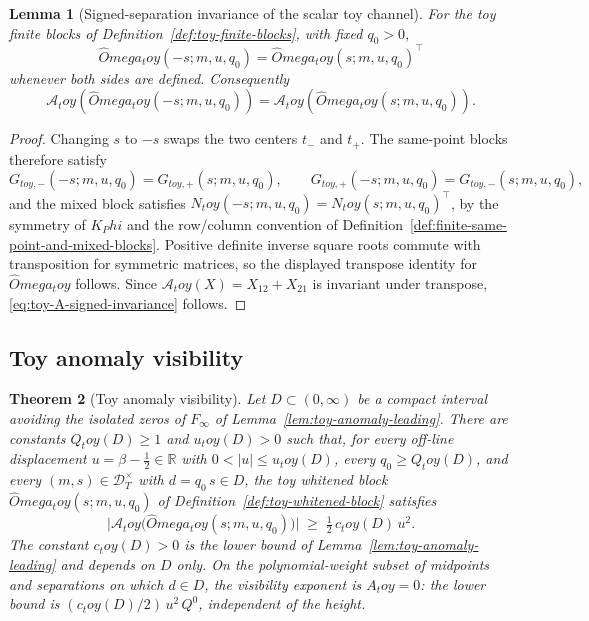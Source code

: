 \documentclass[11pt,a4paper]{amsart}
\def\Omega{Omega}%
\def\Phi{Phi}%
\def\toy{toy}%
\numberwithin{equation}{section}
\theoremstyle{plain}
\newtheorem{theorem}{Theorem}[section]
\newtheorem{lemma}[theorem]{Lemma}
\theoremstyle{definition}
\newcommand{\Om}{\Omega}
\newcommand{\toy}{\mathrm{toy}}
\begin{document}
\begin{lemma}[Signed-separation invariance of the scalar toy channel]
\label{lem:toy-signed-separation-invariance}
For the toy finite blocks of Definition~\ref{def:toy-finite-blocks}, with fixed
\(q_0>0\),
\[
        \widehat\Om_\toy(-s;m,u,q_0)=\widehat\Om_\toy(s;m,u,q_0)^\top
\]
whenever both sides are defined.  Consequently
\begin{equation}
\label{eq:toy-A-signed-invariance}
        \mathcal A_\toy(\widehat\Om_\toy(-s;m,u,q_0))
        =\mathcal A_\toy(\widehat\Om_\toy(s;m,u,q_0)).
\end{equation}
\end{lemma}

\begin{proof}
Changing \(s\) to \(-s\) swaps the two centers \(t_-\) and \(t_+\).
The same-point blocks therefore satisfy
\[
        G_{\toy,-}(-s;m,u,q_0)=G_{\toy,+}(s;m,u,q_0),\qquad
        G_{\toy,+}(-s;m,u,q_0)=G_{\toy,-}(s;m,u,q_0),
\]
and the mixed block satisfies
\(N_\toy(-s;m,u,q_0)=N_\toy(s;m,u,q_0)^\top\), by the symmetry of
\(K_\Phi\) and the row/column convention of
Definition~\ref{def:finite-same-point-and-mixed-blocks}.  Positive
definite inverse square roots commute with transposition for symmetric
matrices, so the displayed transpose identity for \(\widehat\Om_\toy\)
follows.  Since
\(\mathcal A_\toy(X)=X_{12}+X_{21}\) is invariant under transpose,
\eqref{eq:toy-A-signed-invariance} follows.
\end{proof}

\subsection{Toy anomaly visibility}
\label{subsec:toy-anomaly-visibility}

\begin{theorem}[Toy anomaly visibility]
\label{thm:toy-anomaly-visibility}
Let \(D\subset(0,\infty)\) be a compact interval avoiding the
isolated zeros of \(F_{\infty}\) of
Lemma~\ref{lem:toy-anomaly-leading}.  There are constants
\(Q_\toy(D)\ge1\) and \(u_\toy(D)>0\) such that, for every off-line
displacement \(u=\beta-\tfrac12\in\mathbb R\) with \(0<|u|\le u_\toy(D)\),
every \(q_0\ge Q_\toy(D)\), and every \((m,s)\in\mathcal D_T^\times\)
with \(d=q_0\,s\in D\), the toy
whitened block \(\widehat\Om_\toy(s;m,u,q_0)\) of
Definition~\ref{def:toy-whitened-block} satisfies
\begin{equation}
\label{eq:toy-anomaly-visibility-A}
        \bigl|\mathcal A_\toy\bigl(\widehat\Om_\toy(s;m,u,q_0)\bigr)\bigr|
        \;\ge\;
        \tfrac12\,c_\toy(D)\,u^2.
\end{equation}
The constant \(c_\toy(D)>0\) is the lower bound of
Lemma~\ref{lem:toy-anomaly-leading} and depends on \(D\) only.
On the polynomial-weight subset of midpoints and separations on which
\(d\in D\), the visibility exponent is \(A_\toy=0\): the lower bound
is \((c_\toy(D)/2)\,u^2\,Q^0\), independent of the height.
\end{theorem}
\end{document}
